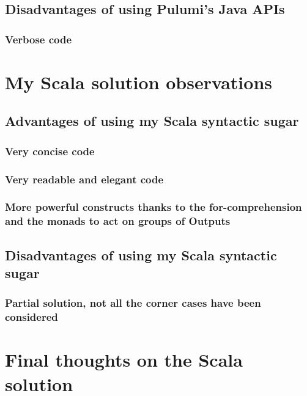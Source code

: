 \subsection{Disadvantages of using Pulumi's Java APIs}

\subsubsection{Verbose code}

\section{My Scala solution observations}

\subsection{Advantages of using my Scala syntactic sugar}

\subsubsection{Very concise code}

\subsubsection{Very readable and elegant code}

\subsubsection{More powerful constructs thanks to the for-comprehension and the monads to act on groups of Outputs}

\subsection{Disadvantages of using my Scala syntactic sugar}

\subsubsection{Partial solution, not all the corner cases have been considered}

\section{Final thoughts on the Scala solution}